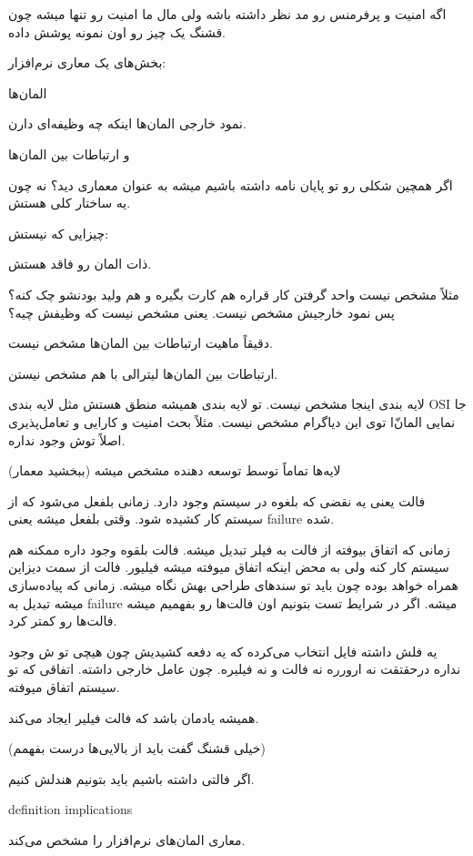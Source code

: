 \documentclass[a4paper]{article}
\begin{document}
اگه امنیت و پرفرمنس رو مد نظر داشته باشه ولی مال ما امنیت رو تنها میشه چون قشنگ
یک چیز رو اون نمونه‌ پوشش داده.

بخش‌های یک معاری نرم‌افزار:

المان‌ها

نمود خارجی المان‌ها اینکه چه وظیفه‌ای دارن.

و ارتباطات بین المان‌ها

اگر همچین شکلی رو تو پایان نامه داشته باشیم میشه به عنوان معماری دید؟ نه چون یه
ساختار کلی هستش.

چیزایی که نیستش:

ذات المان رو فاقد هستش.

مثلاً مشخص نیست واحد گرفتن کار قراره هم کارت بگیره و هم ولید بودنشو چک کنه؟ پس
نمود خارجیش مشخص نیست. یعنی مشخص نیست که وظیفش چیه؟

دقیقاً ماهیت ارتباطات بین المان‌ها مشخص نیست.

ارتباطات بین المان‌ها لیترالی با هم مشخص نیستن.

لایه بندی اینجا مشخص نیست. تو لایه بندی همیشه منطق هستش مثل لایه بندی OSI جا
نمایی المان‌ّا توی این دیاگرام مشخص نیست. مثلاً بحث امنیت و کارایی و تعامل‌پذیری
اصلاً توش وجود نداره.

لایه‌ها تماماً توسط توسعه دهنده مشخص میشه (ببخشید معمار)


فالت یعنی یه نقضی که بلغوه در سیستم وجود دارد. زمانی بلفعل می‌شود که از سیستم
کار کشیده شود. وقتی بلفعل میشه یعنی failure شده.

زمانی که اتفاق بیوفته از فالت به فیلر تبدیل میشه. فالت بلقوه وجود داره ممکنه هم
سیستم کار کنه ولی به محض اینکه اتفاق میوفته میشه فیلیور. فالت از سمت دیزاین
همراه خواهد بوده چون باید تو سند‌های طراحی بهش نگاه میشه. زمانی که پیاده‌سازی
میشه تبدیل به failure میشه. اگر در شرایط تست بتونیم اون فالت‌ها رو بفهمیم میشه
فالت‌ها رو کمتر کرد.

یه فلش داشته فایل انتخاب می‌کرده که یه دفعه کشیدیش چون هیچی تو ش وجود نداره
درحقتقت نه ارورره نه فالت و نه فیلیره. چون عامل خارجی داشته. اتفاقی که تو سیستم
اتفاق میوفته.

همیشه یادمان باشد که فالت فیلیر ایجاد می‌کند.

(خیلی قشنگ گفت باید از بالایی‌ها درست بفهمم)

اگر فالتی داشته باشیم باید بتونیم هندلش کنیم.

definition implications

معاری المان‌های نرم‌افزار را مشخص می‌کند.
\end{document}
